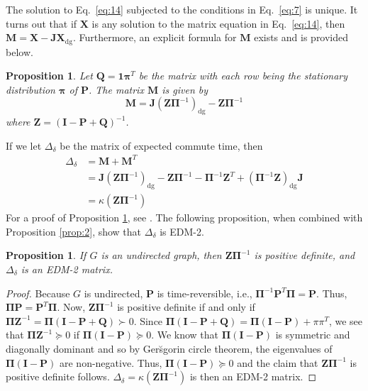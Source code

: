 \documentclass[10pt,twocolumn]{article}
\newtheorem{proposition}[theorem]{Proposition}
\numberwithin{equation}{section}
\begin{document}
The solution to Eq.~\eqref{eq:14} subjected to the conditions in
Eq.~\eqref{eq:7} is unique. It turns out that if $\mathbf{X}$ is any
solution to the matrix equation in Eq.~\eqref{eq:14}, then $\mathbf{M}
= \mathbf{X} - \mathbf{J}\mathbf{X}_{\mathrm{dg}}$. Furthermore, an
explicit formula for $\mathbf{M}$ exists and is provided below. 
\begin{proposition}
  \label{prop:3}
  Let $\mathbf{Q} = \mathbf{1}\bm{\pi}^{T}$ be the matrix with each
  row being the stationary distribution $\bm{\pi}$ of
  $\mathbf{P}$. The matrix $\mathbf{M}$ is given by
  \begin{equation}
    \label{eq:8}
    \mathbf{M} = \mathbf{J}(\mathbf{Z} \bm{\Pi}^{-1})_{\mathrm{dg}} - \mathbf{Z}
    \bm{\Pi}^{-1}
  \end{equation}
  where $\mathbf{Z} = (\mathbf{I} - \mathbf{P} + \mathbf{Q})^{-1}$. 
\end{proposition}
If we let $\Delta_{\delta}$ be the matrix of expected commute time,
then
\begin{equation*}
  \begin{split}
    \Delta_\delta &= \mathbf{M} + \mathbf{M}^{T} \\ &= 
    \mathbf{J}(\mathbf{Z}\bm{\Pi}^{-1})_{\mathrm{dg}} - \mathbf{Z}\bm{\Pi}^{-1} -
    \bm{\Pi}^{-1}\mathbf{Z}^{T} +
    (\bm{\Pi}^{-1}\mathbf{Z})_{\mathrm{dg}}\mathbf{J} \\
    &= \kappa(\mathbf{Z}\bm{\Pi}^{-1})
  \end{split}
\end{equation*}
For a proof of Proposition \ref{prop:3}, see
\cite{kemeny83:_finit_markov_chain}.  The
following proposition, when combined with Proposition \ref{prop:2},
show that $\Delta_{\delta}$ is EDM-2.
\begin{proposition}
  \label{prop:4}
  If $G$ is an undirected graph, then $\mathbf{Z}\bm{\Pi}^{-1}$ is 
  positive definite, and $\Delta_{\delta}$ is an EDM-2 matrix.
\end{proposition}
\begin{proof}
  Because $G$ is undirected, $\mathbf{P}$ is time-reversible, i.e.,
  $\bm{\Pi}^{-1} \mathbf{P}^{T} \bm{\Pi} = \mathbf{P}$. Thus,
  $\bm{\Pi}\mathbf{P} = \mathbf{P}^{T}\bm{\Pi}$. Now,
  $\mathbf{Z}\bm{\Pi}^{-1}$ is positive definite if and only if
  $\bm{\Pi}\mathbf{Z}^{-1} = \bm{\Pi}(\mathbf{I} - \mathbf{P} +
  \mathbf{Q}) \succ 0$. Since $\bm{\Pi}(\mathbf{I} - \mathbf{P} +
  \mathbf{Q}) = \bm{\Pi}(\mathbf{I} - \mathbf{P}) + \pi\pi^{T}$, we
  see that $\bm{\Pi}\mathbf{Z}^{-1} \succeq 0$ if $\bm{\Pi}(\mathbf{I}
  - \mathbf{P}) \succeq 0$. We know that $\bm{\Pi}(\mathbf{I} -
  \mathbf{P})$ is symmetric and diagonally dominant and so by
  Ger\u{s}gorin circle theorem, the eigenvalues of
  $\bm{\Pi}(\mathbf{I} - \mathbf{P})$ are non-negative. Thus,
  $\bm{\Pi}(\mathbf{I} - \mathbf{P}) \succeq 0$ and the claim that
  $\mathbf{Z}\bm{\Pi}^{-1}$ is positive definite
  follows. $\Delta_{\delta} = \kappa(\mathbf{Z}\bm{\Pi}^{-1})$ is then
  an EDM-2 matrix.
\end{proof}
\end{document}
